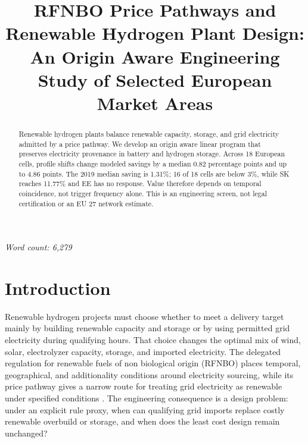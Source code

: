 \documentclass[largeformat]{interact}
\begin{document}
\title{RFNBO Price Pathways and Renewable Hydrogen Plant Design: An Origin Aware Engineering Study of Selected European Market Areas}
\author{
}
\maketitle

\begin{abstract}
Renewable hydrogen plants balance renewable capacity, storage, and grid electricity admitted by a price pathway. We develop an origin aware linear program that preserves electricity provenance in battery and hydrogen storage. Across 18 European cells, profile shifts change modeled savings by a median 0.82 percentage points and up to 4.86 points. The 2019 median saving is 1.31\%; 16 of 18 cells are below 3\%, while SK reaches 11.77\% and EE has no response. Value therefore depends on temporal coincidence, not trigger frequency alone. This is an engineering screen, not legal certification or an EU 27 network estimate.
\end{abstract}

\noindent\textit{Word count: 6,279}

\section{Introduction}\label{introduction}

Renewable hydrogen projects must choose whether to meet a delivery
target mainly by building renewable capacity and storage or by using
permitted grid electricity during qualifying hours. That choice changes
the optimal mix of wind, solar, electrolyzer capacity, storage, and
imported electricity. The delegated regulation for renewable fuels of
non biological origin (RFNBO) places temporal, geographical, and
additionality conditions around electricity sourcing, while its price
pathway gives a narrow route for treating grid electricity as renewable
under specified conditions \citep{ref25,ref26}. The engineering
consequence is a design problem: under an explicit rule proxy, when can
qualifying grid imports replace costly renewable overbuild or storage,
and when does the least cost design remain unchanged?
\end{document}
